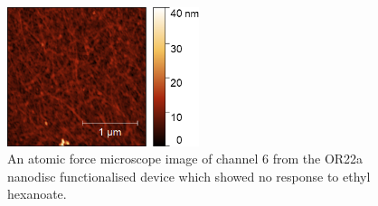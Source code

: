 \documentclass[
  a4paper,
]{scrbook}
\begin{document}
\begin{figure}

{\centering \includegraphics[width=0.5\textwidth,height=\textheight]{figures/ch8/Q4C4_CH6_PostSensing_OR22a_Func_AFM100670_00693.png}

}

\caption{\label{fig-OR22a-variability-AFM}An atomic force microscope
image of channel 6 from the OR22a nanodisc functionalised device which
showed no response to ethyl hexanoate.}

\end{figure}
\end{document}
